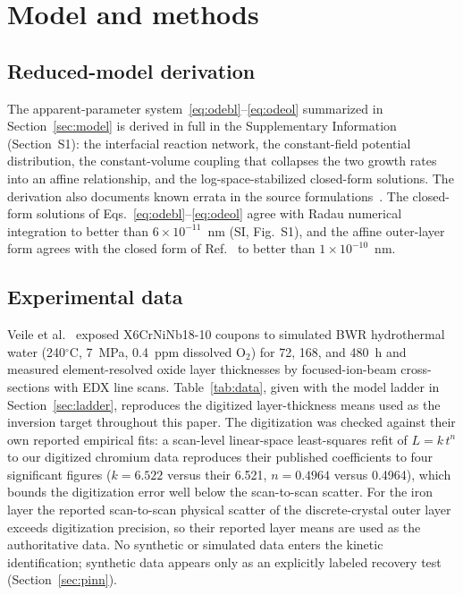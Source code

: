 \documentclass[preprint,12pt]{elsarticle}
\begin{document}
\section{Model and methods}\label{sec:methods}

\subsection{Reduced-model derivation}\label{sec:model-methods}

The apparent-parameter system~\eqref{eq:odebl}--\eqref{eq:odeol}
summarized in Section~\ref{sec:model} is derived in full in the
Supplementary Information (Section~S1): the interfacial reaction
network, the constant-field potential distribution, the constant-volume
coupling that collapses the two growth rates into an affine
relationship, and the log-space-stabilized closed-form solutions. The
derivation also documents known errata in the source
formulations~\citep{li2020scwpdm}. The closed-form solutions of
Eqs.~\eqref{eq:odebl}--\eqref{eq:odeol} agree with Radau numerical
integration to better than $6\times10^{-11}$~nm (SI, Fig.~S1), and the
affine outer-layer form agrees with the closed form of
Ref.~\citep{li2020scwpdm} to better than $1\times10^{-10}$~nm.

\subsection{Experimental data}\label{sec:data}

Veile et al.~\citep{veile2024} exposed X6CrNiNb18-10 coupons to
simulated BWR hydrothermal water (240$^\circ$C, 7~MPa, 0.4~ppm dissolved
O$_2$) for 72, 168, and 480~h and measured element-resolved oxide layer
thicknesses by focused-ion-beam cross-sections with EDX line scans.
Table~\ref{tab:data}, given with the model ladder in
Section~\ref{sec:ladder}, reproduces the digitized layer-thickness means
used as the inversion target throughout this paper. The digitization
was checked against their own reported empirical fits: a scan-level
linear-space least-squares refit of $L = k\,t^n$ to our digitized
chromium data reproduces their published coefficients to four
significant figures ($k = 6.522$ versus their 6.521, $n = 0.4964$
versus 0.4964), which bounds the digitization error well below the
scan-to-scan scatter. For the iron layer the reported scan-to-scan
physical scatter of the discrete-crystal outer layer exceeds
digitization precision, so their reported layer means are used as the
authoritative data. No synthetic or simulated data enters the
kinetic identification; synthetic data appears only as an explicitly
labeled recovery test (Section~\ref{sec:pinn}).
\end{document}
